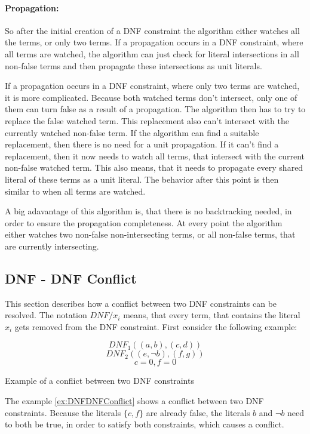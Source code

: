 \paragraph{Propagation:}
So after the initial creation of a DNF constraint the algorithm either watches all the terms, or only two terms. If a propagation occurs in a DNF constraint, where all terms are watched, the algorithm can just check for literal intersections in all non-false terms and then propagate these intersections as unit literals.

If a propagation occurs in a DNF constraint, where only two terms are watched, it is more complicated. Because both watched terms don't intersect, only one of them can turn false as a result of a propagation. The algorithm then has to try to replace the false watched term. This replacement also can't intersect with the currently watched non-false term. If the algorithm can find a suitable replacement, then there is no need for a unit propagation. If it can't find a replacement, then it now needs to watch all terms, that intersect with the current non-false watched term. This also means, that it needs to propagate every shared literal of these terms as a unit literal. The behavior after this point is then similar to when all terms are watched.

A big adavantage of this algorithm is, that there is no backtracking needed, in order to ensure the propagation completeness. At every point the algorithm either watches two non-false non-intersecting terms, or all non-false terms, that are currently intersecting.


\newpage
\subsection{DNF - DNF Conflict}

This section describes how a conflict between two DNF constraints can be resolved. The notation $DNF/x_i$ means, that every term, that contains the literal $x_i$ gets removed from the DNF constraint. First consider the following example:

\begin{example}[!htb]
\begin{leftbar}
\begin{displaymath}
DNF_1 ((a,b),(c,d))
\end{displaymath}
\begin{displaymath}
DNF_2 ((e,\neg b),(f,g))
\end{displaymath}
\begin{displaymath}
c = 0, f = 0
\end{displaymath}
\end{leftbar}
\caption{Example of a conflict between two DNF constraints}
\label{ex:DNFDNFConflict}
\end{example}
The example \ref{ex:DNFDNFConflict} shows a conflict between two DNF constraints. Because the literals $\{c,f\}$ are already false, the literals $b$ and $\neg b$ need to both be true, in order to satisfy both constraints, which causes a conflict.


